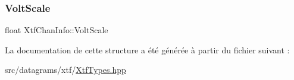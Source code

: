 \subsubsection{\texorpdfstring{Volt\+Scale}{VoltScale}}
{\footnotesize\ttfamily float Xtf\+Chan\+Info\+::\+Volt\+Scale}



La documentation de cette structure a été générée à partir du fichier suivant \+:\begin{DoxyCompactItemize}
\item 
src/datagrams/xtf/\hyperlink{XtfTypes_8hpp}{Xtf\+Types.\+hpp}\end{DoxyCompactItemize}
